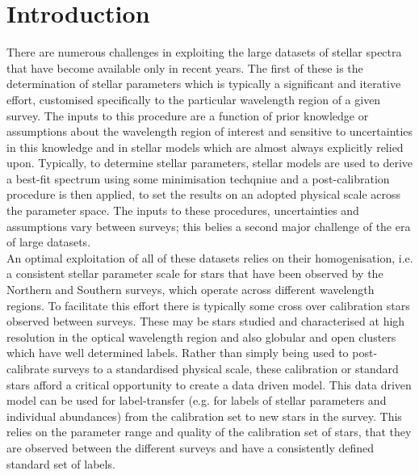 \documentclass[12pt, preprint]{aastex}
\begin{document}
\section{Introduction}

There are numerous challenges in exploiting the large datasets of stellar spectra that have become available only in recent years. The first of these is the determination of stellar parameters which is typically a significant and iterative effort, customised specifically to the particular wavelength region of a given survey. The inputs to this procedure are a function of prior knowledge or assumptions about the wavelength region of interest and sensitive to uncertainties in this knowledge and in stellar models which are almost always explicitly relied upon. Typically, to determine stellar parameters, stellar models are used to derive a best-fit spectrum using some minimisation techqniue and a  post-calibration procedure is then applied, to set the results on an adopted physical scale across the parameter space. The inputs to these procedures, uncertainties and assumptions vary between surveys; this belies a second major challenge of the era of large datasets. \\

An optimal exploitation of all of these datasets relies on their homogenisation, i.e. a consistent stellar parameter scale for stars that have been observed by the Northern and Southern surveys, which operate across different wavelength regions. To facilitate this effort there is typically some cross over calibration stars observed between surveys. These may be stars studied and characterised at high resolution in the optical wavelength region and also globular and open clusters which have well determined labels. Rather than simply being used to post-calibrate surveys to a standardised physical scale, these calibration or standard stars afford a critical opportunity to create a data driven model.  This data driven model can be used for label-transfer (e.g. for labels of stellar parameters and individual abundances) from the calibration set to new stars in the survey. This relies on the parameter range and quality of the calibration set of stars, that they are observed between the different surveys and have a consistently defined standard set of labels. \\
\end{document}
